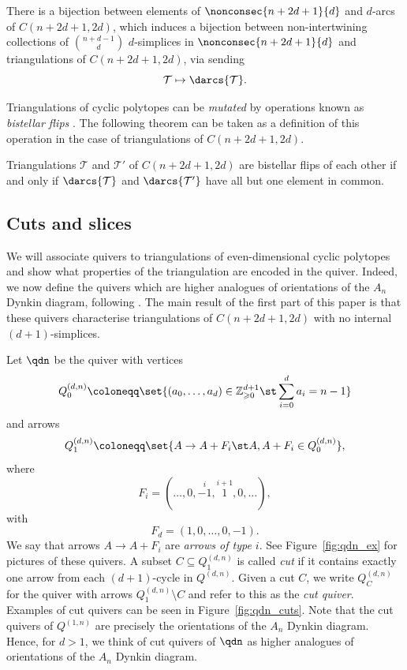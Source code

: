 \begin{theorem}
There is a bijection between elements of $\nonconsec{n + 2d + 1}{d}$ and $d$-arcs of $C(n + 2d + 1, 2d)$, which induces a bijection between non-intertwining collections of $\binom{n + d - 1}{d}$ $d$-simplices in $\nonconsec{n + 2d + 1}{d}$ and triangulations of $C(n + 2d + 1, 2d)$, via sending \[\mathcal{T} \mapsto \darcs{\mathcal{T}}.\]
\end{theorem}

Triangulations of cyclic polytopes can be \emph{mutated} by operations known as \emph{bistellar flips} \cite[Section~2.4]{lrs}. The following theorem can be taken as a definition of this operation in the case of triangulations of $C(n + 2d + 1, 2d)$.

\begin{theorem}[{\cite[Theorem~4.1]{ot}}]\label{thm:flip}
Triangulations $\mathcal{T}$ and $\mathcal{T}'$ of $C(n + 2d + 1,2d)$ are bistellar flips of each other if and only if $\darcs{\mathcal{T}}$ and $\darcs{\mathcal{T}'}$ have all but one element in common.
\end{theorem}

\subsection{Cuts and slices}\label{sect:back:cut_slice}

We will associate quivers to triangulations of even-dimensional cyclic polytopes and show what properties of the triangulation are encoded in the quiver. Indeed, we now define the quivers which are higher analogues of orientations of the $A_{n}$ Dynkin diagram, following \cite{io}. The main result of the first part of this paper is that these quivers characterise triangulations of $C(n + 2d + 1, 2d)$ with no internal $(d + 1)$-simplices.

Let $\qdn$ be the quiver with vertices \[Q_{0}^{(d,n)} \coloneqq \set{(a_{0}, \dots, a_{d}) \in \mathbb{Z}_{\geqslant 0}^{d + 1} \st \sum_{i = 0}^{d}a_{i} = n - 1}\] and arrows \[Q_{1}^{(d, n)} \coloneqq \set{A \to A + F_{i} \st A, A + F_{i} \in Q_{0}^{(d, n)}},\] where \[F_{i} = (\dots, 0, \overset{i}{-1}, \overset{i + 1}{1}, 0, \dots),\] with \[F_{d} = (1, 0, \dots, 0, -1).\] We say that arrows $A \to A + F_{i}$ are \emph{arrows of type $i$}. See Figure~\ref{fig:qdn_ex} for pictures of these quivers. A subset $C \subseteq Q_{1}^{(d, n)}$ is called \emph{cut} if it contains exactly one arrow from each $(d + 1)$-cycle in $Q^{(d, n)}$. Given a cut $C$, we write $Q_{C}^{(d, n)}$ for the quiver with arrows $Q_{1}^{(d, n)}\setminus C$ and refer to this as the \emph{cut quiver}. Examples of cut quivers can be seen in Figure~\ref{fig:qdn_cuts}. Note that the cut quivers of $Q^{(1, n)}$ are precisely the orientations of the $A_{n}$ Dynkin diagram. Hence, for $d > 1$, we think of cut quivers of $\qdn$ as higher analogues of orientations of the $A_{n}$ Dynkin diagram.

